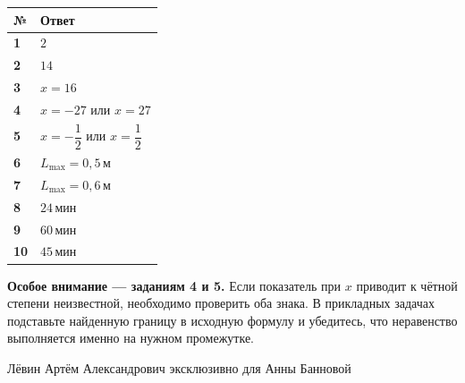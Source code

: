 \documentclass[a4paper,12pt]{article}
\newcommand{\unit}[1]{\,\text{#1}}
\begin{document}
\renewcommand{\arraystretch}{1.7}
\begin{tabularx}{\linewidth}{@{}>{\bfseries}p{12mm}X@{}}
\toprule
\textcolor{darkaccent}{№} & \textcolor{darkaccent}{Ответ} \\
\midrule
1 & $2$ \\
2 & $14$ \\
3 & $x=16$ \\
4 & $x=-27$ или $x=27$ \\
5 & $x=-\dfrac12$ или $x=\dfrac12$ \\
6 & $L_{\max}=0{,}5\unit{м}$ \\
7 & $L_{\max}=0{,}6\unit{м}$ \\
8 & $24\unit{мин}$ \\
9 & $60\unit{мин}$ \\
10 & $45\unit{мин}$ \\
\bottomrule
\end{tabularx}
\vspace{12mm}
\textbf{Особое внимание --- заданиям 4 и 5.} Если показатель при $x$ приводит к чётной степени неизвестной, необходимо проверить оба знака. В прикладных задачах подставьте найденную границу в исходную формулу и убедитесь, что неравенство выполняется именно на нужном промежутке.
\vfill
\begin{center}
\small\color{textgray}Лёвин Артём Александрович эксклюзивно для Анны Банновой
\end{center}
\end{document}
